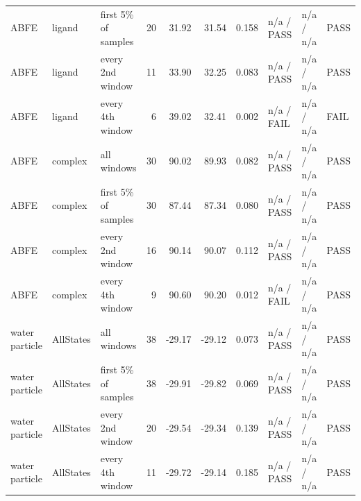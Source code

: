 \begin{tabular}{lllrrrrlll}
ABFE & ligand & first 5\% of samples & 20 & 31.92 & 31.54 & 0.158 & n/a / PASS & n/a / n/a & PASS \\
ABFE & ligand & every 2nd window & 11 & 33.90 & 32.25 & 0.083 & n/a / PASS & n/a / n/a & PASS \\
ABFE & ligand & every 4th window & 6 & 39.02 & 32.41 & 0.002 & n/a / FAIL & n/a / n/a & FAIL \\
ABFE & complex & all windows & 30 & 90.02 & 89.93 & 0.082 & n/a / PASS & n/a / n/a & PASS \\
ABFE & complex & first 5\% of samples & 30 & 87.44 & 87.34 & 0.080 & n/a / PASS & n/a / n/a & PASS \\
ABFE & complex & every 2nd window & 16 & 90.14 & 90.07 & 0.112 & n/a / PASS & n/a / n/a & PASS \\
ABFE & complex & every 4th window & 9 & 90.60 & 90.20 & 0.012 & n/a / FAIL & n/a / n/a & PASS \\
water particle & AllStates & all windows & 38 & -29.17 & -29.12 & 0.073 & n/a / PASS & n/a / n/a & PASS \\
water particle & AllStates & first 5\% of samples & 38 & -29.91 & -29.82 & 0.069 & n/a / PASS & n/a / n/a & PASS \\
water particle & AllStates & every 2nd window & 20 & -29.54 & -29.34 & 0.139 & n/a / PASS & n/a / n/a & PASS \\
water particle & AllStates & every 4th window & 11 & -29.72 & -29.14 & 0.185 & n/a / PASS & n/a / n/a & PASS \\
\bottomrule
\end{tabular}
